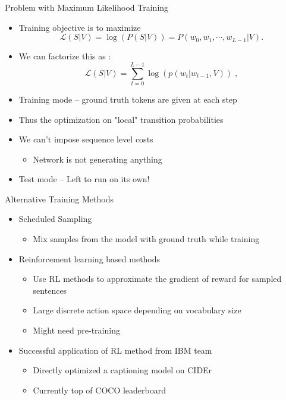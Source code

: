 \documentclass{beamer}
\begin{document}
\begin{frame}{Problem with Maximum Likelihood Training}
\begin{itemize}
    \item Training objective is to maximize 
    \begin{equation*}
            \label{eq:langB1}\mathcal{L}(S | V)  = \log(P(S|V)) = P(w_0, w_1, \cdots, w_{L-1}|V)  .
    \end{equation*}
    \item We can factorize this as :
    \begin{equation*}
      \label{eqCost}
      \mathcal{L}(S | V) = \sum_{t=0}^{L-1} \log(p(w_t|w_{t-1},V)) \; ,
    \end{equation*}
    \item Training mode -- ground truth tokens are given at each step
    \item Thus the optimization on "local" transition probabilities
    \item We can't impose sequence level costs
        \begin{itemize}
            \item Network is not generating anything
        \end{itemize}
    \item Test mode -- Left to run on its own!
\end{itemize}
\end{frame}
\begin{frame}{Alternative Training Methods}
    \begin{itemize}
        \item Scheduled Sampling~\cite{bengio2015scheduled}
            \begin{itemize}
                \item Mix samples from the model with ground truth while training 
            \end{itemize}
        \item Reinforcement learning based methods
            \begin{itemize}
                \item Use RL methods to approximate the gradient of reward for sampled sentences
                \item Large discrete action space depending on vocabulary size
                \item Might need pre-training
            \end{itemize}
        \item Successful application of RL method from IBM team~\cite{rennie2016self}
            \begin{itemize}
                \item Directly optimized a captioning model on CIDEr
                \item Currently top of COCO leaderboard
            \end{itemize}
    \end{itemize}
\end{frame}
\end{document}
